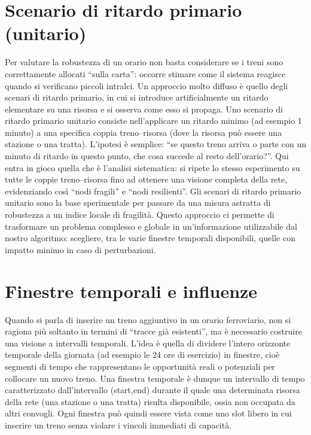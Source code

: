 \documentclass[a4paper,12pt]{report}
\begin{document}
\section{Scenario di ritardo primario (unitario)}
Per valutare la robustezza di un orario non basta considerare se i treni sono correttamente allocati “sulla carta”: occorre stimare come il sistema reagisce quando si verificano piccoli intralci. Un approccio molto diffuso è quello degli scenari di ritardo primario, in cui si introduce artificialmente un ritardo elementare su una risorsa e si osserva come esso si propaga.
Uno scenario di ritardo primario unitario consiste nell’applicare un ritardo minimo (ad esempio 1 minuto) a una specifica coppia treno–risorsa (dove la risorsa può essere una stazione o una tratta). 
L’ipotesi è semplice: “se questo treno arriva o parte con un minuto di ritardo in questo punto, che cosa succede al resto dell’orario?”.
Qui entra in gioco quella che è l'analisi sistematica: si ripete lo stesso esperimento su tutte le coppie treno–risorsa fino ad ottenere una visione completa della rete, evidenziando così “nodi fragili” e “nodi resilienti”.
Gli scenari di ritardo primario unitario sono la base sperimentale per passare da una misura astratta di robustezza a un indice locale di fragilità. Questo approccio ci permette di trasformare un problema complesso e globale in un’informazione utilizzabile dal nostro algoritmo: scegliere, tra le varie finestre temporali disponibili, quelle con impatto minimo in caso di perturbazioni.


\section{Finestre temporali e influenze}

Quando si parla di inserire un treno aggiuntivo in un orario ferroviario, non si ragiona più soltanto in termini di “tracce già esistenti”, ma è necessario costruire una visione a intervalli temporali. 
L’idea è quella di dividere l’intero orizzonte temporale della giornata (ad esempio le 24 ore di esercizio) in finestre, cioè segmenti di tempo che rappresentano le opportunità reali o potenziali per collocare un nuovo treno. 
Una finestra temporale è dunque un intervallo di tempo caratterizzato dall'intervallo (start,end) durante il quale una determinata risorsa della rete (una stazione o una tratta) risulta disponibile, ossia non occupata da altri convogli. Ogni finestra può quindi essere vista come uno slot libero in cui inserire un treno senza violare i vincoli immediati di capacità.
\end{document}
